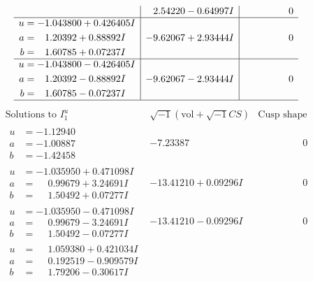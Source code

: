 \documentclass[1p]{elsarticle_modified}
\theoremstyle{definition}
\newcommand{\I}{\sqrt{-1}}
\begin{document}
$$\begin{array}{c|c|c}
 & \phantom{-}2.54220 - 0.64997 I & \phantom{-0.000000 } 0 \\ \hline\begin{aligned}
u &= -1.043800 + 0.426405 I \\
a &= \phantom{-}1.20392 + 0.88892 I \\
b &= \phantom{-}1.60785 + 0.07237 I\end{aligned}
 & -9.62067 + 2.93444 I & \phantom{-0.000000 } 0 \\ \hline\begin{aligned}
u &= -1.043800 - 0.426405 I \\
a &= \phantom{-}1.20392 - 0.88892 I \\
b &= \phantom{-}1.60785 - 0.07237 I\end{aligned}
 & -9.62067 - 2.93444 I & \phantom{-0.000000 } 0\\
 \hline 
 \end{array}$$\newpage$$\begin{array}{c|c|c}  
\text{Solutions to }I^u_{1}& \I (\text{vol} + \sqrt{-1}CS) & \text{Cusp shape}\\
 \hline 
\begin{aligned}
u &= -1.12940\phantom{ +0.000000I} \\
a &= -1.00887\phantom{ +0.000000I} \\
b &= -1.42458\phantom{ +0.000000I}\end{aligned}
 & -7.23387\phantom{ +0.000000I} & \phantom{-0.000000 } 0 \\ \hline\begin{aligned}
u &= -1.035950 + 0.471098 I \\
a &= \phantom{-}0.99679 + 3.24691 I \\
b &= \phantom{-}1.50492 + 0.07277 I\end{aligned}
 & -13.41210 + 0.09296 I & \phantom{-0.000000 } 0 \\ \hline\begin{aligned}
u &= -1.035950 - 0.471098 I \\
a &= \phantom{-}0.99679 - 3.24691 I \\
b &= \phantom{-}1.50492 - 0.07277 I\end{aligned}
 & -13.41210 - 0.09296 I & \phantom{-0.000000 } 0 \\ \hline\begin{aligned}
u &= \phantom{-}1.059380 + 0.421034 I \\
a &= \phantom{-}0.192519 - 0.909579 I \\
b &= \phantom{-}1.79206 - 0.30617 I\end{aligned}

\end{array}$$
\end{document}
